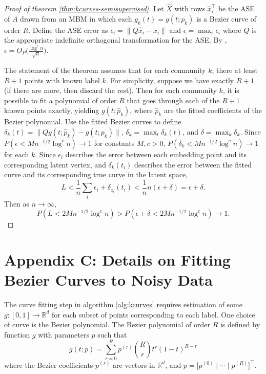 \documentclass[
  12pt,
]{article}
\theoremstyle{definition}
\theoremstyle{definition}
\theoremstyle{definition}
\theoremstyle{definition}
\theoremstyle{remark}
\begin{document}
\begin{proof}[Proof of theorem \ref{thm:kcurves-semisupervised}]
Let $\hat{X}$ with rows $\hat{x}_i^\top$ be the ASE of $A$ drawn from an MBM in which each $g_k(t) = g(t; p_k)$ is a Bezier curve of order $R$. 
Define the ASE error as $\epsilon_i = \|Q \hat{x}_i - x_i\|$ and $\epsilon = \max_i \epsilon_i$ where $Q$ is the appropriate indefinite orthogonal transformation for the ASE. 
By \citet{rubindelanchy2017statistical}, $\epsilon = O_P \bigg(\frac{\log^c n}{\sqrt{n}} \bigg)$. 

The statement of the theorem assumes that for each community $k$, there at least $R + 1$ points with known label $k$. 
For simplicity, suppose we have exactly $R + 1$ (if there are more, then discard the rest). 
Then for each community $k$, it is possible to fit a polynomial of order $R$ that goes through each of the $R + 1$ known points exactly, yielding $g(t; \hat{p}_k)$, where $\hat{p}_k$ are the fitted coefficients of the Bezier polynomial. 
Use the fitted Bezier curves to define $\delta_k(t) = \|Q g(t; \hat{p}_k) - g(t; p_k)\|$, $\delta_k = \max_t \delta_k(t)$, and $\delta = \max_k \delta_k$. 
Since $P(\epsilon < M n^{-1/2} \log^c n) \to 1$ for constants $M, c > 0$, 
$P(\delta_k < M n^{-1/2} \log^c n) \to 1$ for each $k$. 
Since $\epsilon_i$ describes the error between each embedding point and its corresponding latent vertex, and $\delta_k(t_i)$ describes the error between the fitted curve and its corresponding true curve in the latent space, 
$$L < \frac{1}{n} \sum_i \epsilon_i + \delta_{z_i}(t_i) < \frac{1}{n} n (\epsilon + \delta) = \epsilon + \delta.$$ 
Then as $n \to \infty$, 
$$P(L < 2 M n^{-1/2} \log^c n) > P(\epsilon + \delta < 2 M n^{-1/2} \log^c n) \to 1.$$
\end{proof}

\newpage

\section*{Appendix C: Details on Fitting Bezier Curves to Noisy Data}

The curve fitting step in algorithm \ref{alg:kcurves} requires estimation of some \(g: [0, 1] \to \mathbb{R}^d\) for each subset of points corresponding to each label.
One choice of curve is the Bezier polynomial.
The Bezier polynomial of order \(R\) is defined by function \(g\) with parameters \(p\) such that
\[g(t; p) = \sum_{r=0}^R p^{(r)} \binom{R}{r} t^r (1-t)^{R-r}\]
where the Bezier coefficients \(p^{(r)}\) are vectors in \(\mathbb{R}^d\), and \(p = \Big[ p^{(0)} \mid \cdots \mid p^{(R)} \Big]^\top\).
\end{document}
